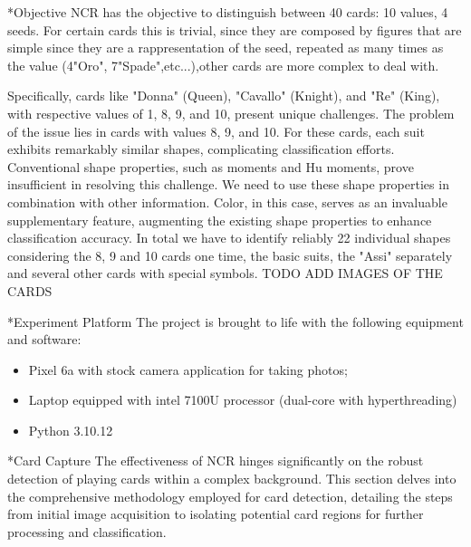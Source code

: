 \documentclass[twocolumn, a4paper,10pt]{article}
\makeatletter
\renewcommand\subsection{\@startsection{subsection}{1}{\z@}{\z@}{\z@}{\normalfont\normalsize\bfseries}}
\renewcommand\subsection{\@startsection{subsection}{1}{\z@}{\z@}{0.1pt}{\normalfont\normalsize\bfseries}}
\makeatother
\begin{document}
\subsection*{Objective}
NCR has the objective to distinguish between 40 cards: 10 values, 4 seeds.
For certain cards this is trivial, since they are composed by figures that are simple since they are a rappresentation of the seed, repeated as many times as the value (4"Oro", 7"Spade",etc...),other cards are more complex to deal with.

Specifically, cards like "Donna" (Queen), "Cavallo" (Knight), and "Re" (King), with respective values of 1, 8, 9, and 10, present unique challenges. The problem of the issue lies in cards with values 8, 9, and 10. For these cards, each suit exhibits remarkably similar shapes, complicating classification efforts.
Conventional shape properties, such as moments and Hu moments, prove insufficient in resolving this challenge. We need to use these shape properties in combination with other information. 
Color, in this case, serves as an invaluable supplementary feature, augmenting the existing shape properties to enhance classification accuracy.
In total we have to identify reliably 22 individual shapes considering the 8, 9 and 10 cards one time, the basic suits, the "Assi" separately and several other cards with special symbols.
TODO ADD IMAGES OF THE CARDS

\subsection*{Experiment Platform}
The project is brought to life with the following equipment and software:
\begin{itemize}
  \item Pixel 6a with stock camera application for taking photos;
  \item Laptop equipped with intel 7100U processor (dual-core with hyperthreading)
  \item Python 3.10.12 

\end{itemize}

\subsection*{Card Capture}
The effectiveness of NCR hinges significantly on the robust detection of playing cards within a complex background. This section delves into the comprehensive methodology employed for card detection, detailing the steps from initial image acquisition to isolating potential card regions for further processing and classification.
\end{document}
